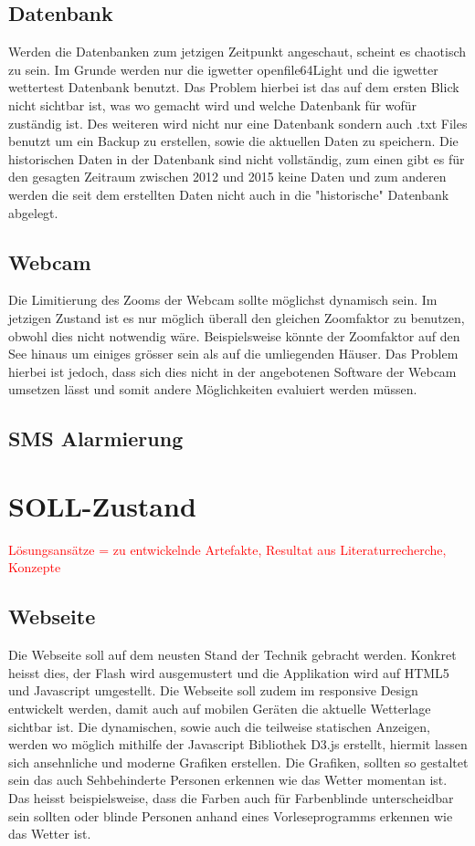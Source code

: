 \documentclass[a4paper,ngerman, 11pt]{report}
\newcommand\Diskussionspunkt[1]{\textcolor{red}{#1}}
\begin{document}
\subsection{Datenbank}
Werden die Datenbanken zum jetzigen Zeitpunkt angeschaut, scheint es chaotisch zu sein. Im Grunde werden nur die igwetter openfile64Light und die igwetter wettertest Datenbank benutzt. Das Problem hierbei ist das auf dem ersten Blick nicht sichtbar ist, was wo gemacht wird und welche Datenbank für wofür zuständig ist. Des weiteren wird nicht nur eine Datenbank sondern auch .txt Files benutzt um ein Backup zu erstellen, sowie die aktuellen Daten zu speichern. Die historischen Daten in der Datenbank sind nicht vollständig, zum einen gibt es für den gesagten Zeitraum zwischen 2012 und 2015 keine Daten und zum anderen werden die seit dem erstellten Daten nicht auch in die "historische" Datenbank abgelegt.

\subsection{Webcam}
Die Limitierung des Zooms der Webcam sollte möglichst dynamisch sein. Im jetzigen Zustand ist es nur möglich überall den gleichen Zoomfaktor zu benutzen, obwohl dies nicht notwendig wäre. Beispielsweise könnte der Zoomfaktor auf den See hinaus um einiges grösser sein als auf die umliegenden Häuser. Das Problem hierbei ist jedoch, dass sich dies nicht in der angebotenen Software der Webcam umsetzen lässt und somit andere Möglichkeiten evaluiert werden müssen.

\subsection{SMS Alarmierung}

\section{SOLL-Zustand}
\Diskussionspunkt{Lösungsansätze = zu entwickelnde Artefakte, 
Resultat aus Literaturrecherche, 
Konzepte}

\subsection{Webseite}
Die Webseite soll auf dem neusten Stand der Technik gebracht werden. Konkret heisst dies, der Flash wird ausgemustert und die Applikation wird auf HTML5 und Javascript umgestellt. Die Webseite soll zudem im responsive Design entwickelt werden, damit auch auf mobilen Geräten die aktuelle Wetterlage sichtbar ist. Die dynamischen, sowie auch die teilweise statischen Anzeigen, werden wo möglich mithilfe der Javascript Bibliothek D3.js erstellt, hiermit lassen sich ansehnliche und moderne Grafiken erstellen. Die Grafiken, sollten so gestaltet sein das auch Sehbehinderte Personen erkennen wie das Wetter momentan ist. Das heisst beispielsweise, dass die Farben auch für Farbenblinde unterscheidbar sein sollten oder blinde Personen anhand eines Vorleseprogramms erkennen wie das Wetter ist.
\end{document}
